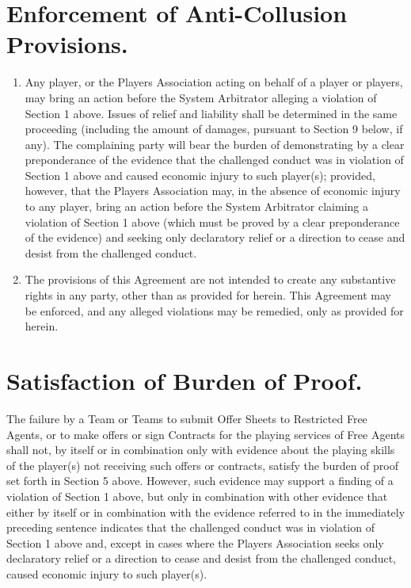 \documentclass[
]{book}
\providecommand{\tightlist}{%
  \setlength{\itemsep}{0pt}\setlength{\parskip}{0pt}}
\begin{document}
\hypertarget{enforcement-of-anti-collusion-provisions.}{%
\section{Enforcement of Anti-Collusion Provisions.}\label{enforcement-of-anti-collusion-provisions.}}

\begin{enumerate}
\def\labelenumi{(\alph{enumi})}
\tightlist
\item
  Any player, or the Players Association acting on behalf of a player or players, may bring an action before the System Arbitrator alleging a violation of Section 1 above. Issues of relief and liability shall be determined in the same proceeding (including the amount of damages, pursuant to Section 9 below, if any). The complaining party will bear the burden of demonstrating by a clear preponderance of the evidence that the challenged conduct was in violation of Section 1 above and caused economic injury to such player(s); provided, however, that the Players Association may, in the absence of economic injury to any player, bring an action before the System Arbitrator claiming a violation of Section 1 above (which must be proved by a clear preponderance of the evidence) and seeking only declaratory relief or a direction to cease and desist from the challenged conduct.
\item
  The provisions of this Agreement are not intended to create any substantive rights in any party, other than as provided for herein. This Agreement may be enforced, and any alleged violations may be remedied, only as provided for herein.
\end{enumerate}

\hypertarget{satisfaction-of-burden-of-proof.}{%
\section{Satisfaction of Burden of Proof.}\label{satisfaction-of-burden-of-proof.}}

The failure by a Team or Teams to submit Offer Sheets to Restricted Free Agents, or to make offers or sign Contracts for the playing services of Free Agents shall not, by itself or in combination only with evidence about the playing skills of the player(s) not receiving such offers or contracts, satisfy the burden of proof set forth in Section 5 above. However, such evidence may support a finding of a violation of Section 1 above, but only in combination with other evidence that either by itself or in combination with the evidence referred to in the immediately preceding sentence indicates that the challenged conduct was in violation of Section 1 above and, except in cases where the Players Association seeks only declaratory relief or a direction to cease and desist from the challenged conduct, caused economic injury to such player(s).
\end{document}

